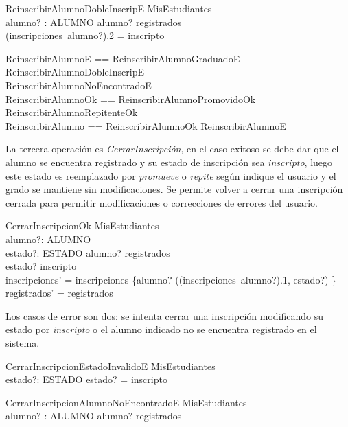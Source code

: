 \documentclass{article}
\begin{document}
\begin{schema}{ReinscribirAlumnoDobleInscripE}
    \Xi MisEstudiantes \\
    alumno? : ALUMNO
    \where
    alumno? \in registrados \\
    (inscripciones~alumno?).2 = inscripto
\end{schema}

\begin{zed}
    ReinscribirAlumnoE == ReinscribirAlumnoGraduadoE \lor ReinscribirAlumnoDobleInscripE \\
        \lor ReinscribirAlumnoNoEncontradoE \\
    ReinscribirAlumnoOk == ReinscribirAlumnoPromovidoOk \lor ReinscribirAlumnoRepitenteOk \\
    ReinscribirAlumno == ReinscribirAlumnoOk \lor ReinscribirAlumnoE
\end{zed}

La tercera operación es \emph{CerrarInscripción}, en el caso exitoso se debe dar que el alumno se encuentra registrado y su estado de inscripción sea \emph{inscripto}, luego este estado es reemplazado por \emph{promueve} o \emph{repite} según indique el usuario y el grado se mantiene sin modificaciones. Se permite volver a cerrar una inscripción cerrada para permitir modificaciones o correcciones de errores del usuario.

\begin{schema}{CerrarInscripcionOk}
    \Delta MisEstudiantes \\
    alumno?: ALUMNO \\
    estado?: ESTADO
    \where
    alumno? \in registrados \\
    estado? \neq inscripto \\
    inscripciones' = inscripciones \oplus \{alumno? \mapsto ((inscripciones~alumno?).1, estado?) \} \\
    registrados' = registrados
\end{schema}

Los casos de error son dos: se intenta cerrar una inscripción modificando su estado por \emph{inscripto} o el alumno indicado no se encuentra registrado en el sistema.

\begin{schema}{CerrarInscripcionEstadoInvalidoE}
    \Xi MisEstudiantes \\
    estado?: ESTADO
    \where
    estado? = inscripto
\end{schema}

\begin{schema}{CerrarInscripcionAlumnoNoEncontradoE}
    \Xi MisEstudiantes \\
    alumno? : ALUMNO
    \where
    alumno? \notin registrados
\end{schema}
\end{document}
